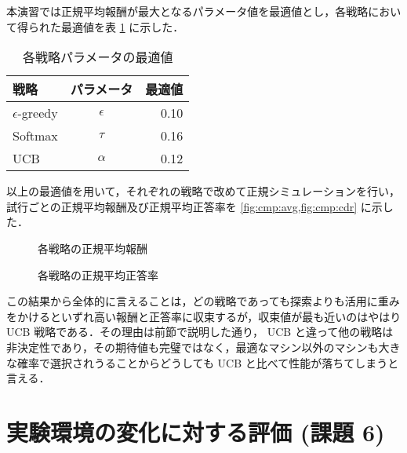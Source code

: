 \documentclass{jsarticle}
\newlength{\figwidth}
\begin{document}
本演習では正規平均報酬が最大となるパラメータ値を最適値とし，各戦略において得られた最適値を表 \ref{tab:opt_vals} に示した．

\begin{table}[H]
  \centering
  \caption{各戦略パラメータの最適値}\label{tab:opt_vals}
  \begin{tabular}{lcr}
    \toprule
    戦略 & パラメータ &  最適値 \\
    \midrule
    $\epsilon$-greedy & $\epsilon$ & 0.10 \\
    Softmax & $\tau$ & 0.16 \\
    UCB & $\alpha$ & 0.12 \\
    \bottomrule
  \end{tabular}
\end{table}

以上の最適値を用いて，それぞれの戦略で改めて正規シミュレーションを行い，試行ごとの正規平均報酬及び正規平均正答率を \cref{fig:cmp:avg,fig:cmp:cdr} に示した．

\begin{figure}[H]
\centering
{}
\caption{各戦略の正規平均報酬}\label{fig:cmp:avg}
\end{figure}

\begin{figure}[H]
\centering
{}
\caption{各戦略の正規平均正答率}\label{fig:cmp:cdr}
\end{figure}

この結果から全体的に言えることは，どの戦略であっても探索よりも活用に重みをかけるといずれ高い報酬と正答率に収束するが，収束値が最も近いのはやはり UCB 戦略である．その理由は前節で説明した通り， UCB と違って他の戦略は非決定性であり，その期待値も完璧ではなく，最適なマシン以外のマシンも大きな確率で選択されうることからどうしても UCB と比べて性能が落ちてしまうと言える．

\section{実験環境の変化に対する評価 (課題 6)}\label{sec:k6}
\end{document}
